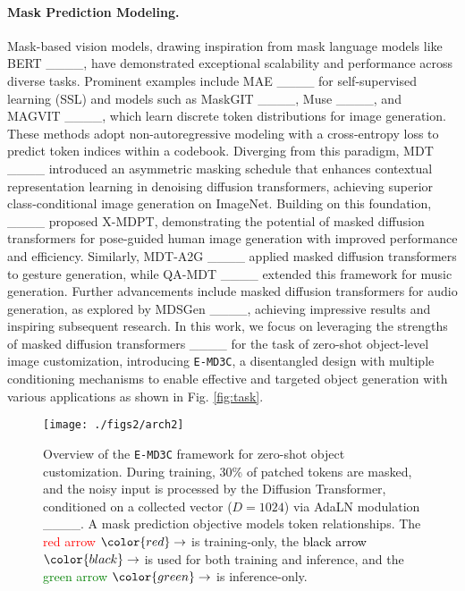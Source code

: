 \paragraph{Mask Prediction Modeling.}
Mask-based vision models, drawing inspiration from mask language models like BERT ____, have demonstrated exceptional scalability and performance across diverse tasks. Prominent examples include MAE ____ for self-supervised learning (SSL) and models such as MaskGIT ____, Muse ____, and MAGVIT ____, which learn discrete token distributions for image generation. These methods adopt non-autoregressive modeling with a cross-entropy loss to predict token indices within a codebook. Diverging from this paradigm, MDT ____ introduced an asymmetric masking schedule that enhances contextual representation learning in denoising diffusion transformers, achieving superior class-conditional image generation on ImageNet. Building on this foundation, ____ proposed X-MDPT, demonstrating the potential of masked diffusion transformers for pose-guided human image generation with improved performance and efficiency. Similarly, MDT-A2G ____ applied masked diffusion transformers to gesture generation, while QA-MDT ____ extended this framework for music generation. Further advancements include masked diffusion transformers for audio generation, as explored by MDSGen ____, achieving impressive results and inspiring subsequent research. In this work, we focus on leveraging the strengths of masked diffusion transformers ____ for the task of zero-shot object-level image customization, introducing \texttt{E-MD3C}, a disentangled design with multiple conditioning mechanisms to enable effective and targeted object generation with various applications as shown in Fig. \ref{fig:task}. 

\begin{figure*}%
  \centering
  \texttt{[image: ./figs2/arch2]}
  \vspace{-8pt}
  \caption{Overview of the \texttt{E-MD3C} framework for zero-shot object customization. During training, 30\% of patched tokens are masked, and the noisy input is processed by the Diffusion Transformer, conditioned on a collected vector ($D=1024$) via AdaLN modulation ____. A mask prediction objective models token relationships. The \textcolor{red}{red arrow} $\color{red}\rightarrow$ is training-only, the \textcolor{black}{black arrow} $\color{black}\rightarrow$ is used for both training and inference, and the \textcolor{green}{green arrow} $\color{green}\rightarrow$ is inference-only.}
  \label{fig:arch}
  \vspace{-12pt}
\end{figure*}